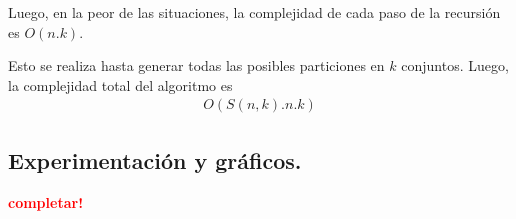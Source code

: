 Luego, en la peor de las situaciones, la complejidad de cada paso de la
recursión es $O(n . k)$.

Esto se realiza hasta generar todas las posibles particiones en $k$ conjuntos.
Luego, la complejidad total del algoritmo es
\begin{align*}
  O(S(n, k) . n . k)
\end{align*}


\newpage \subsection{Experimentación y gráficos.}
\vspace*{0.3cm}

\textcolor{red}{\textbf{completar!}}
